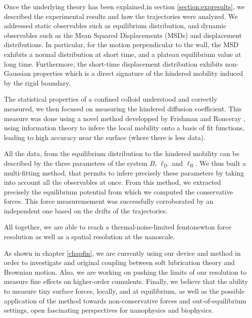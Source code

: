 Once the underlying theory has been explained,in section \ref{section:expresults}, we described  the experimental results and how the trajectories were analyzed. We addressed static observables such as equilibrium distribution, and dynamic observables such as the Mean Squared Displacements (\gls{MSD}s) and displacement distributions. In particular, for the motion perpendicular to the wall, the \gls{MSD} exhibits a normal distribution at short time, and a plateau equilibrium value at long time. Furthermore, the short-time displacement distribution exhibits non-Gaussian properties which is a direct signature of the hindered mobility induced by the rigid boundary.

The statistical properties of a confined colloid understood and correctly measured, we then focused on measuring the hindered diffusion coefficient. This measure was done using a novel method developped by Frishman and Ronceray \cite{frishman_learning_2020}, using information theory to infere the local mobility onto a basis of fit functions, leading to high accuracy near the surface (where there is less data). 

All the data, from the equilibrium distribution to the hindered mobility can be described by the three parameters of the system $B$, $\ell _\mathrm{D}$ and $\ell_\mathrm{B}$. We thus built a multi-fitting method, that permits to infere precisely these parameters by taking into account all the observables at once. From this method, we extracted precisely the equilibrium potential from which we computed the conservative forces. This force measuremement was successfully corroborated by an independent one based on the drifts of the trajectories.

All together, we are able to reach a thermal-noise-limited femtonewton force resolution as well as a spatial resolution at the nanoscale.

As shown in chapter \ref{chapfin}, we are currently using our device and method in order to investigate and original coupling between soft lubrication theory and Brownian motion. Also, we are working on pushing the limits of our resolution to measure fine effects on higher-order cumulents. Finally, we believe that the ability to measure tiny surface forces, locally, and at equilibrium, as well as the possible application of the method towards non-conservative forces and out-of-equilibrium settings, open fascinating perspectives for nanophysics and biophysics.



\newpage

